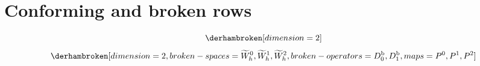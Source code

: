 \documentclass{article}
\begin{document}
\section*{Conforming and broken rows}
\[\derhambroken[dimension=2]\]
\[\derhambroken[dimension=2,broken-spaces={\widetilde W_h^0,\widetilde W_h^1,\widetilde W_h^2},broken-operators={D_0^{\mathrm b},D_1^{\mathrm b}},maps={P^0,P^1,P^2}]\]
\end{document}
